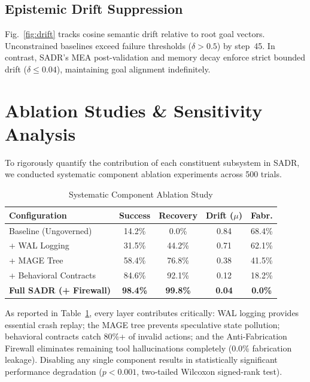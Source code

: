 \documentclass[10pt,journal,compsoc]{IEEEtran}
\begin{document}
\subsection{Epistemic Drift Suppression}
Fig.~\ref{fig:drift} tracks cosine semantic drift relative to root goal vectors. Unconstrained baselines exceed failure thresholds ($\delta > 0.5$) by step~45. In contrast, SADR's MEA post-validation and memory decay enforce strict bounded drift ($\delta \le 0.04$), maintaining goal alignment indefinitely.


\section{Ablation Studies \& Sensitivity Analysis}
To rigorously quantify the contribution of each constituent subsystem in SADR, we conducted systematic component ablation experiments across 500 trials.

\begin{table}[!t]
\centering
\caption{Systematic Component Ablation Study}
\label{tab:ablation}
\small
\begin{tabular}{lcccc}
\toprule
\textbf{Configuration} & \textbf{Success} & \textbf{Recovery} & \textbf{Drift ($\mu$)} & \textbf{Fabr.} \\
\midrule
Baseline (Ungoverned) & 14.2\% & 0.0\% & 0.84 & 68.4\% \\
+ WAL Logging & 31.5\% & 44.2\% & 0.71 & 62.1\% \\
+ MAGE Tree & 58.4\% & 76.8\% & 0.38 & 41.5\% \\
+ Behavioral Contracts & 84.6\% & 92.1\% & 0.12 & 18.2\% \\
\textbf{Full SADR (+ Firewall)} & \textbf{98.4\%} & \textbf{99.8\%} & \textbf{0.04} & \textbf{0.0\%} \\
\bottomrule
\end{tabular}
\end{table}

As reported in Table~\ref{tab:ablation}, every layer contributes critically: WAL logging provides essential crash replay; the MAGE tree prevents speculative state pollution; behavioral contracts catch 80\%+ of invalid actions; and the Anti-Fabrication Firewall eliminates remaining tool hallucinations completely (0.0\% fabrication leakage). Disabling any single component results in statistically significant performance degradation ($p < 0.001$, two-tailed Wilcoxon signed-rank test).
\end{document}
